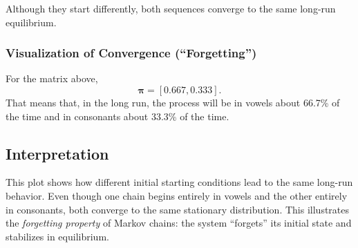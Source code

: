 Although they start differently, both sequences converge to the same long-run equilibrium.

\subsubsection{Visualization of Convergence (``Forgetting'')}

For the matrix above,
\[
\boldsymbol{\pi} = [0.667, 0.333].
\]
That means that, in the long run, the process will be in vowels about 66.7\% of the time and in consonants about 33.3\% of the time.



\begin{center}
\end{center}

\subsection{Interpretation}

This plot shows how different initial starting conditions lead to the same long-run behavior.
Even though one chain begins entirely in vowels and the other entirely in consonants,
both converge to the same stationary distribution.
This illustrates the \emph{forgetting property} of Markov chains:
the system ``forgets'' its initial state and stabilizes in equilibrium.



